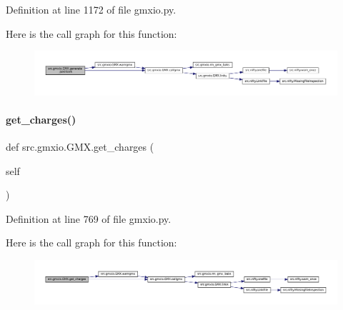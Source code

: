 Definition at line 1172 of file gmxio.\+py.

Here is the call graph for this function\+:
\nopagebreak
\begin{figure}[H]
\begin{center}
\leavevmode
\includegraphics[width=350pt]{classsrc_1_1gmxio_1_1GMX_a414ad54bca72f823dee0cb5239cc8e58_cgraph}
\end{center}
\end{figure}
\mbox{\label{classsrc_1_1gmxio_1_1GMX_ab8c1d39bda1b3d7060b9348fe8a1b074}} 
\paragraph{\texorpdfstring{get\+\_\+charges()}{get\_charges()}}
{\footnotesize\ttfamily def src.\+gmxio.\+G\+M\+X.\+get\+\_\+charges (\begin{DoxyParamCaption}\item[{}]{self }\end{DoxyParamCaption})}



Definition at line 769 of file gmxio.\+py.

Here is the call graph for this function\+:
\nopagebreak
\begin{figure}[H]
\begin{center}
\leavevmode
\includegraphics[width=350pt]{classsrc_1_1gmxio_1_1GMX_ab8c1d39bda1b3d7060b9348fe8a1b074_cgraph}
\end{center}
\end{figure}
\mbox{\label{classsrc_1_1gmxio_1_1GMX_a1374e65cac6409dfde7e90b110f4c599}} 
